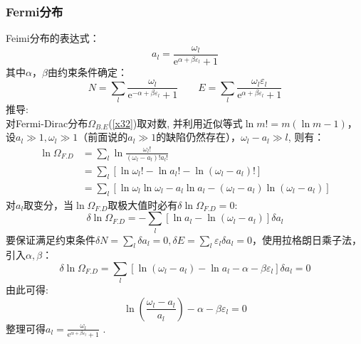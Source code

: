 \documentclass[12pt]{article}
\begin{document}
\subsubsection{Fermi分布}
\noindent
Feimi分布的表达式：
\begin{equation}
	a_l=\frac{\omega_l}{\mathrm{e}^{\alpha +\beta \varepsilon_l}+1}
\end{equation}
其中$\alpha$，$\beta$由约束条件确定：
\begin{equation}
	N=\sum_{l} \frac{\omega_l}{\mathrm{e}^{-\alpha+\beta\varepsilon_l}+1}\quad\quad E=\sum_{l} \frac{ \omega_l \varepsilon_l}{ \mathrm{e}^{\alpha+\beta\varepsilon_l}+1}
\end{equation}
推导:\\
对Fermi-Dirac分布$\Omega_{B.E}$(\ref{x32})取对数, 并利用近似等式$\ln m!=m(\ln m-1)$，设$a_l\gg 1, \omega_l\gg 1$（前面说的$a_l\gg1$的缺陷仍然存在），$\omega_l-a_l\gg l$, 则有：
\begin{equation}
	\begin{split}
		\ln \Omega_{F.D}&=\sum_l\ln\frac{\omega_l!}{(\omega_l-a_l)! a_l!} 
		\\
		&=\sum_l [\ln \omega_l!-\ln a_l!-\ln(\omega_l-a_l)!]
		\\
		&=\sum_{l}[\ln \omega_l \ln \omega_l -a_l\ln a_l-(\omega_l-a_l)\ln (\omega_l-a_l)]
	\end{split}
\end{equation}
对$a_l$取变分，当$\ln \Omega_{F.D}$取极大值时必有$\delta \ln \Omega_{F.D}=0$:
\begin{equation}
	\delta \ln \Omega_{F.D}=-\sum_l [\ln a_l -\ln (\omega_l-a_l)]\delta a_l
\end{equation}
要保证满足约束条件$\delta N=\sum_l \delta a_l =0, \delta E=\sum_{l} \varepsilon_l \delta a_l=0$，使用拉格朗日乘子法，引入$\alpha, \beta$：
\begin{equation}
	\delta \ln \Omega_{F.D}= \sum_l [\ln (\omega_l-a_l)-\ln a_l-\alpha -\beta \varepsilon_l]\delta a_l=0
\end{equation}
由此可得:
\begin{equation}
	\ln (\frac{\omega_l-a_l}{a_l})-\alpha-\beta \varepsilon_l=0
\end{equation}
整理可得$a_l=\frac{\omega_l}{\mathrm{e}^{\alpha+\beta \varepsilon_l}+1}$ .
\end{document}
